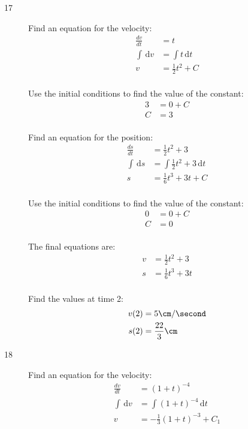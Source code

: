 \documentclass{exam}
\begin{document}
\begin{description}
\item[17]
Find an equation for the velocity:
\begin{align*}
  \frac{dv}{dt} &= t \\
  \int  \, \mathrm{d}v &= \int t \, \mathrm{d}t \\
  v &= \frac{1}{2} t^2 + C \\
\end{align*}

Use the initial conditions to find the value of the constant:
\begin{align*}
  3 &= 0 + C \\
  C &= 3 \\
\end{align*}

Find an equation for the position:
\begin{align*}
  \frac{ds}{dt} &= \frac{1}{2} t^2 + 3 \\
  \int \, \mathrm{d}s &= \int \frac{1}{2} t^2 + 3 \, \mathrm{d}t \\
  s &= \frac{1}{6} t^3 + 3t + C \\
\end{align*}

Use the initial conditions to find the value of the constant:
\begin{align*}
  0 &= 0 + C \\
  C &= 0 \\
\end{align*}

The final equations are:
\begin{align*}
  v &= \frac{1}{2} t^2 + 3 \\
  s &= \frac{1}{6} t^3 + 3t \\
\end{align*}

Find the values at time 2:
\begin{align*}
  v(2) &= 5 \cm / \second \\
  s(2) &= \frac{22}{3} \cm \\
\end{align*}

\item[18]
Find an equation for the velocity:
\begin{align*}
  \frac{dv}{dt} &= (1 + t)^{-4} \\
  \int  \, \mathrm{d}v &= \int (1 + t)^{-4} \, \mathrm{d}t \\
  v &= -\frac{1}{3} (1 + t)^{-3} + C_1 \\
\end{align*}


\end{description}
\end{document}
